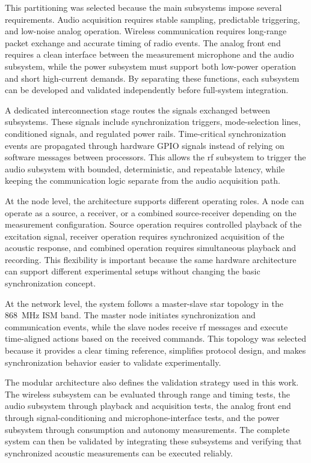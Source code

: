 This partitioning was selected because the main subsystems impose several requirements. Audio acquisition requires stable sampling, predictable triggering, and low-noise analog operation. Wireless communication requires long-range packet exchange and accurate timing of radio events. The analog front end requires a clean interface between the measurement microphone and the audio subsystem, while the power subsystem must support both low-power operation and short high-current demands. By separating these functions, each subsystem can be developed and validated independently before full-system integration.

A dedicated interconnection stage routes the signals exchanged between subsystems. These signals include synchronization triggers, mode-selection lines, conditioned signals, and regulated power rails. Time-critical synchronization events are propagated through hardware GPIO signals instead of relying on software messages between processors. This allows the \acrshort{rf} subsystem to trigger the audio subsystem with bounded, deterministic, and repeatable latency, while keeping the communication logic separate from the audio acquisition path.

At the node level, the architecture supports different operating roles. A node can operate as a source, a receiver, or a combined source-receiver depending on the measurement configuration. Source operation requires controlled playback of the excitation signal, receiver operation requires synchronized acquisition of the acoustic response, and combined operation requires simultaneous playback and recording. This flexibility is important because the same hardware architecture can support different experimental setups without changing the basic synchronization concept.

At the network level, the system follows a master-slave star topology in the 868~MHz ISM band. The master node initiates synchronization and communication events, while the slave nodes receive \acrshort{rf} messages and execute time-aligned actions based on the received commands. This topology was selected because it provides a clear timing reference, simplifies protocol design, and makes synchronization behavior easier to validate experimentally.

The modular architecture also defines the validation strategy used in this work. The wireless subsystem can be evaluated through range and timing tests, the audio subsystem through playback and acquisition tests, the analog front end through signal-conditioning and microphone-interface tests, and the power subsystem through consumption and autonomy measurements. The complete system can then be validated by integrating these subsystems and verifying that synchronized acoustic measurements can be executed reliably.



